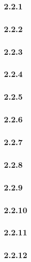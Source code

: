 \subsubsection*{2.2.1}


\subsubsection*{2.2.2}


\subsubsection*{2.2.3}


\subsubsection*{2.2.4}


\subsubsection*{2.2.5}


\subsubsection*{2.2.6}


\subsubsection*{2.2.7}


\subsubsection*{2.2.8}


\subsubsection*{2.2.9}


\subsubsection*{2.2.10}


\subsubsection*{2.2.11}


\subsubsection*{2.2.12}

